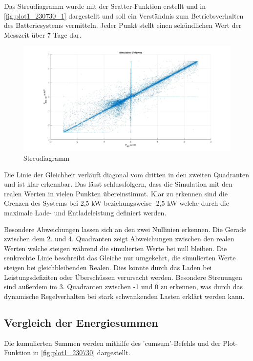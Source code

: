 Das Streudiagramm wurde mit der Scatter-Funktion erstellt und in \autoref{fig:plot1_230730_1} dargestellt und soll ein Verständnis zum Betriebsverhalten des Batteriesystems vermitteln. Jeder Punkt stellt einen sekündlichen Wert der Messzeit über 7 Tage dar.
\begin{figure}[H]
    \centering
    \includegraphics[width=\textwidth]{Abbildungen/streudiagramm.jpg}
    \caption{Streudiagramm}
    \label{fig:plot1_230730_1}
\end{figure}

Die Linie der Gleichheit verläuft diagonal vom dritten in den zweiten Quadranten und ist klar erkennbar. Das lässt schlussfolgern, dass die Simulation mit den realen Werten in vielen Punkten übereinstimmt.
Klar zu erkennen sind die Grenzen des Systems bei 2,5 kW beziehungsweise -2,5 kW welche durch die maximale Lade- und Entladeleistung definiert werden.

Besondere Abweichungen lassen sich an den zwei Nullinien erkennen. Die Gerade zwischen dem 2. und 4. Quadranten zeigt Abweichungen zwischen den realen Werten welche steigen während die simulierten Werte bei null bleiben. Die senkrechte Linie beschreibt das Gleiche nur umgekehrt, die simulierten Werte steigen bei gleichbleibenden Realen.
Dies könnte durch das Laden bei Leistungsdefiziten oder Überschüssen verursacht werden.
Besondere Streuungen sind außerdem im 3. Quadranten zwischen -1 und 0 zu erkennen, was durch das dynamische Regelverhalten bei stark schwankenden Lasten erklärt werden kann. 

\subsection{Vergleich der Energiesummen}
Die kumulierten Summen werden mithilfe des 'cumsum'-Befehls und der Plot-Funktion in \autoref{fig:plot1_230730} dargestellt.

